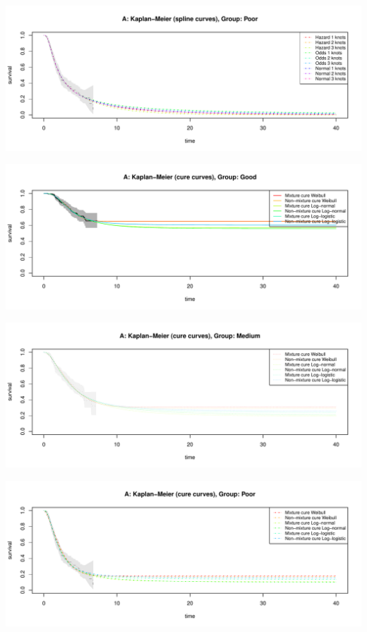 \documentclass[
]{article}
\begin{document}
\begin{flushleft}\includegraphics[height=0.29\textheight]{BC_OS_output/Images/Figure_validate_extrapolation_KM-6} \end{flushleft}

\begin{flushleft}\includegraphics[height=0.29\textheight]{BC_OS_output/Images/Figure_validate_extrapolation_KM-7} \end{flushleft}

\begin{flushleft}\includegraphics[height=0.29\textheight]{BC_OS_output/Images/Figure_validate_extrapolation_KM-8} \end{flushleft}

\begin{flushleft}\includegraphics[height=0.29\textheight]{BC_OS_output/Images/Figure_validate_extrapolation_KM-9} \end{flushleft}
\end{document}
